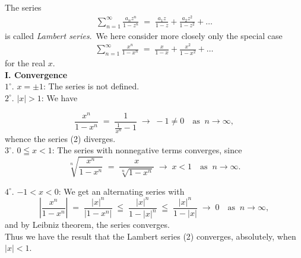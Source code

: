 \documentclass[12pt]{article}
\theoremstyle{definition}
\begin{document}

The series
\begin{align}
\sum_{n=1}^\infty\frac{a_nz^n}{1\!-\!z^n} \;=\; \frac{a_1z}{1\!-\!z}+\frac{a_2z^2}{1\!-\!z^2}+\ldots
\end{align}
is called {\em Lambert series}.\, We here consider more closely only the special case
\begin{align}
\sum_{n=1}^\infty\frac{x^n}{1\!-\!x^n} \;=\; \frac{x}{1\!-\!x}+\frac{x^2}{1\!-\!x^2}+\ldots
\end{align}
for the real  $x$.\\



\textbf{I.\; Convergence}\\

$1^\circ.$\; $x = \pm1$:\; The series is not defined.\\

$2^\circ.$\;  $|x| > 1$:\; We have

\[
\frac{x^n}{1\!-\!x^n} \;=\; \frac{1}{\frac{1}{x^n}\!-\!1} \;\to\; -1 \neq 0 
\quad \mbox{as}\;\; n \to \infty,
\]
whence the series (2) diverges.\\

$3^\circ.$\;  $0 \leqq x < 1$:\; The series with nonnegative terms converges, since
\[
\sqrt[n]{\frac{x^n}{1\!-\!x^n}} \;=\; \frac{x}{\sqrt[n]{1\!-\!x^n}} \;\to\; x < 1
\quad \mbox{as}\;\; n \to \infty.
\]

$4^\circ.$\;  $-1 < x < 0$:\; We get an alternating series with
\[
\left|\frac{x^n}{1\!-\!x^n}\right| \;=\; \frac{|x|^n}{|1\!-\!x^n|} \;\leqq\; \frac{|x|^n}{1\!-\!|x|^n}
\;\leqq\; \frac{|x|^n}{1\!-\!|x|} \;\to\; 0 \quad \mbox{as}\;\; n \to \infty,
\]
and by Leibniz theorem, the series converges.\\

Thus we have the result that the Lambert series (2) converges,  absolutely, when\, $|x| < 1$.\\


\\
\end{document}

